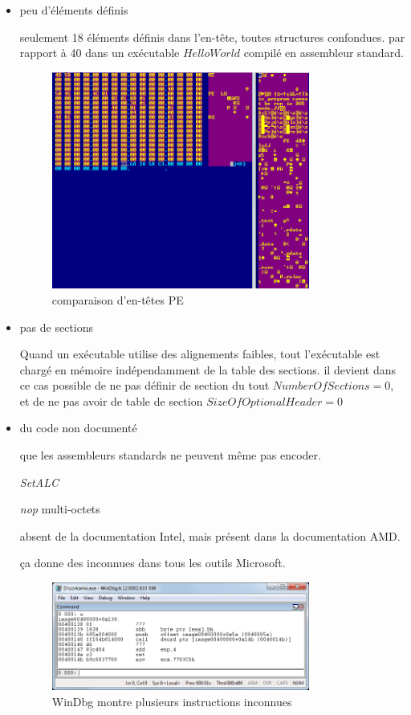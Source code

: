 \begin{itemize}
\item peu d'éléments définis

seulement 18 éléments définis dans l'en-tête, toutes structures confondues. par rapport à 40 dans un exécutable $Hello World$ compilé en assembleur standard.
\begin{figure}[ht]
  \centering
  \includegraphics[width=0.8\textwidth]{albertini/img/empty_pe_header}
  \caption{comparaison d'en-têtes PE}
  \label{fig:albertini:empty_pe_header}
\end{figure}

\item pas de sections

Quand un exécutable utilise des alignements faibles, tout l'exécutable est chargé en mémoire indépendamment de la table des sections. il devient dans ce cas possible de ne pas définir de section du tout $NumberOfSections = 0$, et de ne pas avoir de table de section $SizeOfOptionalHeader = 0$

\item du code non documenté

que les assembleurs standards ne peuvent même pas encoder.

{\em SetALC}

{\em nop} multi-octets

absent de la documentation Intel, mais présent dans la documentation AMD.

ça donne des inconnues dans tous les outils Microsoft.
\begin{figure}[ht]
  \centering
  \includegraphics[width=0.8\textwidth]{albertini/img/corkamix_windbg}
  \caption{WinDbg montre plusieurs instructions inconnues}
  \label{fig:albertini:corkamix_windbg}
\end{figure}


\end{itemize}
